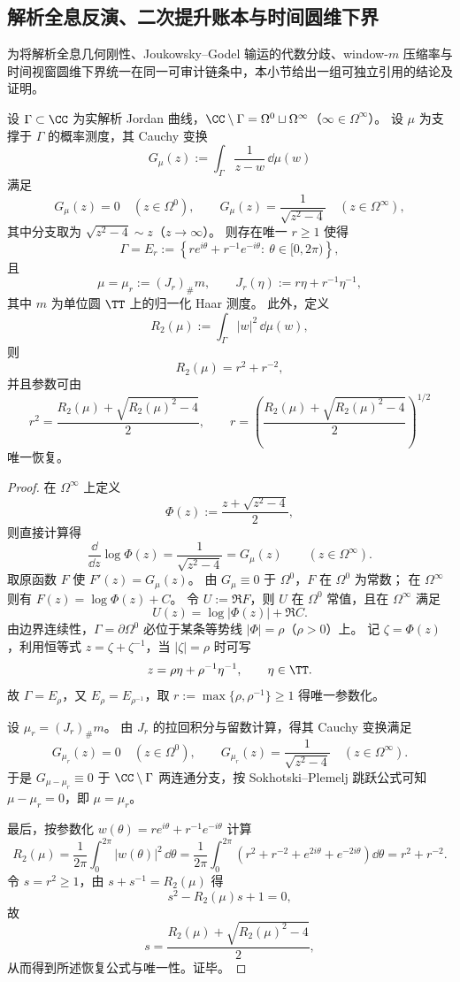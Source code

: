 \subsection{解析全息反演、二次提升账本与时间圆维下界}\label{subsec:conclusion-analytic-holography-joukowsky-ledger-time-dimension}
为将解析全息几何刚性、Joukowsky--Godel 输运的代数分歧、window-\(m\) 压缩率与时间视窗圆维下界统一在同一可审计链条中，本小节给出一组可独立引用的结论及证明。

\begin{theorem}[解析全息反演刚性与二阶径向矩的唯一读出]\label{thm:conclusion-analytic-holography-inversion-rigidity}
设 \(\Gamma\subset\CC\) 为实解析 Jordan 曲线，\(\CC\setminus\Gamma=\Omega^0\sqcup\Omega^\infty\)（\(\infty\in\Omega^\infty\)）。
设 \(\mu\) 为支撑于 \(\Gamma\) 的概率测度，其 Cauchy 变换
\[
G_\mu(z):=\int_\Gamma \frac{1}{z-w}\,\dd\mu(w)
\]
满足
\[
G_\mu(z)=0\quad(z\in\Omega^0),\qquad
G_\mu(z)=\frac{1}{\sqrt{z^2-4}}\quad(z\in\Omega^\infty),
\]
其中分支取为 \(\sqrt{z^2-4}\sim z\)（\(z\to\infty\)）。
则存在唯一 \(r\ge 1\) 使得
\[
\Gamma=E_r:=\left\{r e^{i\theta}+r^{-1}e^{-i\theta}:\ \theta\in[0,2\pi)\right\},
\]
且
\[
\mu=\mu_r:=(J_r)_\# m,\qquad J_r(\eta):=r\eta+r^{-1}\eta^{-1},
\]
其中 \(m\) 为单位圆 \(\TT\) 上的归一化 Haar 测度。
此外，定义
\[
R_2(\mu):=\int_\Gamma |w|^2\,\dd\mu(w),
\]
则
\[
R_2(\mu)=r^2+r^{-2},
\]
并且参数可由
\[
r^2=\frac{R_2(\mu)+\sqrt{R_2(\mu)^2-4}}{2},
\qquad
r=\left(\frac{R_2(\mu)+\sqrt{R_2(\mu)^2-4}}{2}\right)^{1/2}
\]
唯一恢复。
\end{theorem}
\begin{proof}
在 \(\Omega^\infty\) 上定义
\[
\Phi(z):=\frac{z+\sqrt{z^2-4}}{2},
\]
则直接计算得
\[
\frac{\dd}{\dd z}\log\Phi(z)=\frac{1}{\sqrt{z^2-4}}=G_\mu(z)\qquad(z\in\Omega^\infty).
\]
取原函数 \(F\) 使 \(F'(z)=G_\mu(z)\)。
由 \(G_\mu\equiv 0\) 于 \(\Omega^0\)，\(F\) 在 \(\Omega^0\) 为常数；
在 \(\Omega^\infty\) 则有 \(F(z)=\log\Phi(z)+C\)。
令 \(U:=\Re F\)，则 \(U\) 在 \(\Omega^0\) 常值，且在 \(\Omega^\infty\) 满足
\[
U(z)=\log|\Phi(z)|+\Re C.
\]
由边界连续性，\(\Gamma=\partial\Omega^0\) 必位于某条等势线 \(|\Phi|=\rho\)（\(\rho>0\)）上。
记 \(\zeta=\Phi(z)\)，利用恒等式 \(z=\zeta+\zeta^{-1}\)，当 \(|\zeta|=\rho\) 时可写
\[
z=\rho\eta+\rho^{-1}\eta^{-1},\qquad \eta\in\TT.
\]
故 \(\Gamma=E_\rho\)，又 \(E_\rho=E_{\rho^{-1}}\)，取 \(r:=\max\{\rho,\rho^{-1}\}\ge 1\) 得唯一参数化。

设 \(\mu_r=(J_r)_\#m\)。
由 \(J_r\) 的拉回积分与留数计算，得其 Cauchy 变换满足
\[
G_{\mu_r}(z)=0\quad(z\in\Omega^0),\qquad
G_{\mu_r}(z)=\frac{1}{\sqrt{z^2-4}}\quad(z\in\Omega^\infty).
\]
于是 \(G_{\mu-\mu_r}\equiv 0\) 于 \(\CC\setminus\Gamma\) 两连通分支，按 Sokhotski--Plemelj 跳跃公式可知 \(\mu-\mu_r=0\)，即 \(\mu=\mu_r\)。

最后，按参数化 \(w(\theta)=r e^{i\theta}+r^{-1}e^{-i\theta}\) 计算
\[
R_2(\mu)=\frac{1}{2\pi}\int_0^{2\pi}|w(\theta)|^2\,\dd\theta
=\frac{1}{2\pi}\int_0^{2\pi}\!\left(r^2+r^{-2}+e^{2i\theta}+e^{-2i\theta}\right)\dd\theta
=r^2+r^{-2}.
\]
令 \(s=r^2\ge 1\)，由 \(s+s^{-1}=R_2(\mu)\) 得
\[
s^2-R_2(\mu)s+1=0,
\]
故
\[
s=\frac{R_2(\mu)+\sqrt{R_2(\mu)^2-4}}{2},
\]
从而得到所述恢复公式与唯一性。证毕。
\end{proof}

